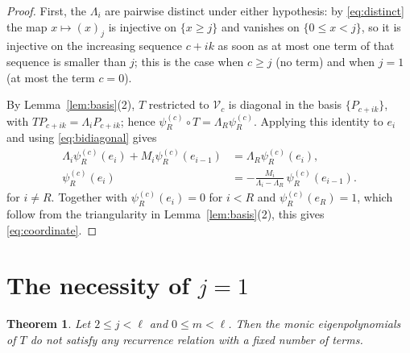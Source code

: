 \documentclass{amsart}
\newtheorem{theorem}{Theorem}[section]
\theoremstyle{definition}
\newcommand{\fall}[2]{(#1)_{#2}}
\begin{document}
\begin{proof}
First, the \(\Lambda_i\) are pairwise distinct under either hypothesis: by
\eqref{eq:distinct} the map \(x\mapsto\fall{x}{j}\) is injective on
\(\{x\ge j\}\) and vanishes on \(\{0\le x<j\}\), so it is injective on the
increasing sequence \(c+ik\) as soon as at most one term of that sequence is
smaller than \(j\); this is the case when \(c\ge j\) (no term) and when
\(j=1\) (at most the term \(c=0\)).

By Lemma~\ref{lem:basis}(2), \(T\) restricted to \(\mathcal V_c\) is diagonal
in the basis \(\{P_{c+ik}\}\), with \(TP_{c+ik}=\Lambda_iP_{c+ik}\); hence
\(\psi^{(c)}_R\circ T=\Lambda_R\psi^{(c)}_R\).  Applying this identity to
\(e_i\) and using \eqref{eq:bidiagonal} gives
\begin{align*}
\Lambda_i\psi^{(c)}_R(e_i)+M_i\psi^{(c)}_R(e_{i-1})
&=\Lambda_R\psi^{(c)}_R(e_i),\\
\psi^{(c)}_R(e_i)
&=-\frac{M_i}{\Lambda_i-\Lambda_R}\,\psi^{(c)}_R(e_{i-1}).
\end{align*}
for \(i\ne R\).  Together with \(\psi^{(c)}_R(e_i)=0\) for \(i<R\) and
\(\psi^{(c)}_R(e_R)=1\), which follow from the triangularity in
Lemma~\ref{lem:basis}(2), this gives \eqref{eq:coordinate}.
\end{proof}

\section{The necessity of \texorpdfstring{\(j=1\)}{j=1}}\label{sec:necessity}

\begin{theorem}\label{thm:jge2}
Let \(2\le j<\ell\) and \(0\le m<\ell\).  Then the monic eigenpolynomials of
\(T\) do not satisfy any recurrence relation with a fixed number of terms.
\end{theorem}
\end{document}
